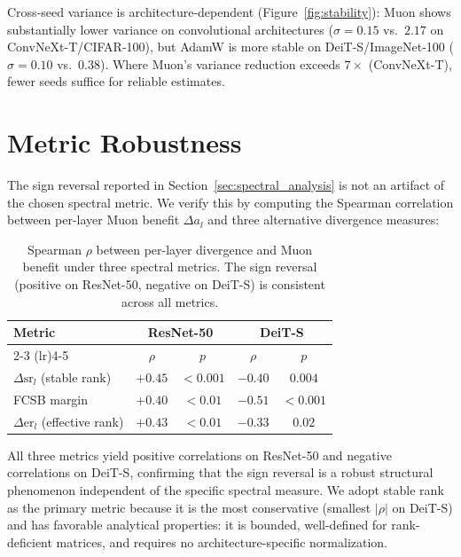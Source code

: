 Cross-seed variance is architecture-dependent (Figure~\ref{fig:stability}): Muon shows substantially lower variance on convolutional architectures ($\sigma{=}0.15$ vs.\ $2.17$ on ConvNeXt-T/CIFAR-100), but AdamW is more stable on DeiT-S/ImageNet-100 ($\sigma{=}0.10$ vs.\ $0.38$).
Where Muon's variance reduction exceeds $7\times$ (ConvNeXt-T), fewer seeds suffice for reliable estimates.

\section{Metric Robustness}\label{sec:metric_robustness}

The sign reversal reported in Section~\ref{sec:spectral_analysis} is not an artifact of the chosen spectral metric. We verify this by computing the Spearman correlation between per-layer Muon benefit $\Delta a_l$ and three alternative divergence measures:

\begin{table}[h]
\centering
\caption{Spearman $\rho$ between per-layer divergence and Muon benefit under three spectral metrics. The sign reversal (positive on ResNet-50, negative on DeiT-S) is consistent across all metrics.}
\label{tab:metric_robustness}
\small
\begin{tabular}{@{}lcccc@{}}
\toprule
Metric & \multicolumn{2}{c}{ResNet-50} & \multicolumn{2}{c}{DeiT-S} \\
\cmidrule(lr){2-3} \cmidrule(lr){4-5}
 & $\rho$ & $p$ & $\rho$ & $p$ \\
\midrule
$\Delta\mathrm{sr}_l$ (stable rank) & $+0.45$ & ${<}0.001$ & $-0.40$ & $0.004$ \\
FCSB margin & $+0.40$ & ${<}0.01$ & $-0.51$ & ${<}0.001$ \\
$\Delta\mathrm{er}_l$ (effective rank) & $+0.43$ & ${<}0.01$ & $-0.33$ & $0.02$ \\
\bottomrule
\end{tabular}
\end{table}

All three metrics yield positive correlations on ResNet-50 and negative correlations on DeiT-S, confirming that the sign reversal is a robust structural phenomenon independent of the specific spectral measure.
We adopt stable rank as the primary metric because it is the most conservative (smallest $|\rho|$ on DeiT-S) and has favorable analytical properties: it is bounded, well-defined for rank-deficient matrices, and requires no architecture-specific normalization.

